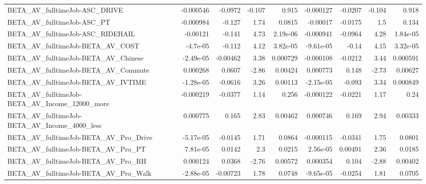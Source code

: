 \begin{tabular}{lrrrrrrrr}
BETA\_AV\_fulltimeJob-ASC\_DRIVE                      &   -0.000546 &      -0.0972 &    -0.107 &    0.915 &  -0.000127 &     -0.0207 &       -0.104 &         0.918 \\
BETA\_AV\_fulltimeJob-ASC\_PT                         &   -0.000984 &       -0.127 &      1.74 &   0.0815 &   -0.00017 &     -0.0175 &          1.5 &         0.134 \\
BETA\_AV\_fulltimeJob-ASC\_RIDEHAIL                   &    -0.00121 &       -0.141 &      4.73 & 2.19e-06 &  -0.000941 &     -0.0964 &         4.28 &      1.84e-05 \\
BETA\_AV\_fulltimeJob-BETA\_AV\_COST                   &    -4.7e-05 &       -0.112 &      4.12 & 3.82e-05 &  -9.61e-05 &       -0.14 &         4.15 &      3.32e-05 \\
BETA\_AV\_fulltimeJob-BETA\_AV\_Chinese                &   -2.49e-05 &     -0.00462 &      3.38 & 0.000729 &  -0.000108 &     -0.0212 &         3.44 &      0.000591 \\
BETA\_AV\_fulltimeJob-BETA\_AV\_Commute                &    0.000268 &       0.0607 &     -2.86 &  0.00424 &   0.000773 &       0.148 &        -2.73 &       0.00627 \\
BETA\_AV\_fulltimeJob-BETA\_AV\_IVTIME                 &   -1.28e-05 &      -0.0616 &      3.26 &  0.00113 &  -2.15e-05 &      -0.093 &         3.34 &      0.000849 \\
BETA\_AV\_fulltimeJob-BETA\_AV\_Income\_12000\_more      &   -0.000219 &      -0.0377 &      1.14 &    0.256 &  -0.000122 &     -0.0221 &         1.17 &          0.24 \\
BETA\_AV\_fulltimeJob-BETA\_AV\_Income\_4000\_less       &    0.000775 &        0.165 &      2.83 &  0.00462 &   0.000746 &       0.169 &         2.94 &       0.00333 \\
BETA\_AV\_fulltimeJob-BETA\_AV\_Pro\_Drive              &   -5.17e-05 &      -0.0145 &      1.71 &   0.0864 &  -0.000115 &     -0.0341 &         1.75 &        0.0801 \\
BETA\_AV\_fulltimeJob-BETA\_AV\_Pro\_PT                 &    7.81e-05 &       0.0142 &       2.3 &   0.0215 &   2.56e-05 &     0.00491 &         2.36 &        0.0185 \\
BETA\_AV\_fulltimeJob-BETA\_AV\_Pro\_RH                 &    0.000124 &       0.0368 &     -2.76 &  0.00572 &   0.000354 &       0.104 &        -2.88 &       0.00402 \\
BETA\_AV\_fulltimeJob-BETA\_AV\_Pro\_Walk               &   -2.88e-05 &     -0.00723 &      1.78 &   0.0748 &  -9.65e-05 &     -0.0254 &         1.81 &        0.0705 \\

\end{tabular}
